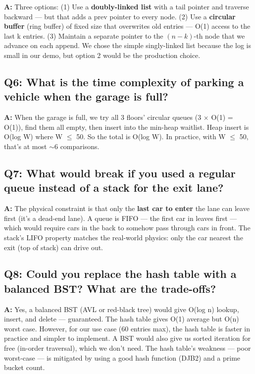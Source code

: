 \documentclass[12pt, a4paper]{article}
\begin{document}
\textbf{A:} Three options: (1) Use a \textbf{doubly-linked list} with a tail pointer and traverse backward --- but that adds a prev pointer to every node. (2) Use a \textbf{circular buffer} (ring buffer) of fixed size that overwrites old entries --- O(1) access to the last k entries. (3) Maintain a separate pointer to the $(n-k)$-th node that we advance on each append. We chose the simple singly-linked list because the log is small in our demo, but option 2 would be the production choice.

\subsection{Q6: What is the time complexity of parking a vehicle when the garage is full?}

\textbf{A:} When the garage is full, we try all 3 floors' circular queues (3 $\times$ O(1) = O(1)), find them all empty, then insert into the min-heap waitlist. Heap insert is O(log W) where W $\leq$ 50. So the total is O(log W). In practice, with W $\leq$ 50, that's at most $\sim$6 comparisons.

\subsection{Q7: What would break if you used a regular queue instead of a stack for the exit lane?}

\textbf{A:} The physical constraint is that only the \textbf{last car to enter} the lane can leave first (it's a dead-end lane). A queue is FIFO --- the first car in leaves first --- which would require cars in the back to somehow pass through cars in front. The stack's LIFO property matches the real-world physics: only the car nearest the exit (top of stack) can drive out.

\subsection{Q8: Could you replace the hash table with a balanced BST? What are the trade-offs?}

\textbf{A:} Yes, a balanced BST (AVL or red-black tree) would give O(log n) lookup, insert, and delete --- guaranteed. The hash table gives O(1) average but O(n) worst case. However, for our use case (60 entries max), the hash table is faster in practice and simpler to implement. A BST would also give us sorted iteration for free (in-order traversal), which we don't need. The hash table's weakness --- poor worst-case --- is mitigated by using a good hash function (DJB2) and a prime bucket count.
\end{document}
